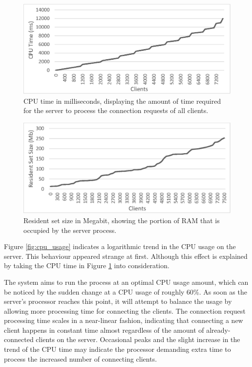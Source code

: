 \documentclass[bsc, 12pt, twoside, singlespacing, parskip, abbrevs, notimes, normalheadings, logo, deptreport]{styles/infthesis}
\begin{document}
\begin{figure}[H]
\centering
\includegraphics[scale=0.9]{images/test_CLIENT_CPUtime.eps}
\caption{CPU time in milliseconds, displaying the amount of time required for the server to process the connection requests of all clients.}
\label{fig:cpu_time}
\end{figure}

\begin{figure}[H]
\centering
\includegraphics[scale=0.9]{images/test_CLIENT_RSS.eps}
%
\caption{Resident set size in Megabit, showing the portion of RAM that is occupied by the server process.}
\label{fig:cpu_rss}
\end{figure}

Figure \ref{fig:cpu_usage} indicates a logarithmic trend in the CPU usage on the server. This behaviour appeared strange at first. Although this effect is explained by taking the CPU time in Figure \ref{fig:cpu_time} into consideration. 

The system aims to run the process at an optimal CPU usage amount, which can be noticed by the sudden change at a CPU usage of roughly 60\%. As soon as the server's processor reaches this point, it will attempt to balance the usage by allowing more processing time for connecting the clients. The connection request processing time scales in a near-linear fashion, indicating that connecting a new client happens in constant time almost regardless of the amount of already-connected clients on the server. Occasional peaks and the slight increase in the trend of the CPU time may indicate the processor demanding extra time to process the increased number of connecting clients.
\end{document}
